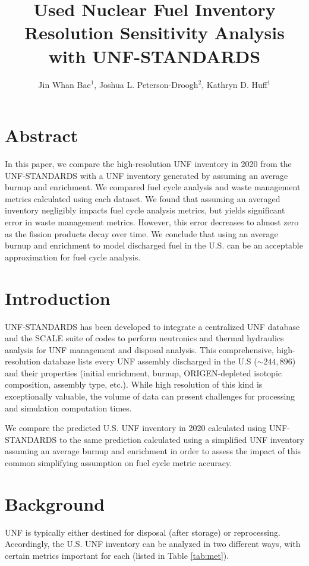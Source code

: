 \documentclass{anstrans}
\title{Used Nuclear Fuel Inventory Resolution Sensitivity Analysis with UNF-STANDARDS}
\author{Jin Whan Bae$^{1}$, Joshua L. Peterson-Droogh$^{2}$, Kathryn D. Huff$^{1}$}
\institute{
$^{1}$ Dept. of Nuclear, Plasma, and Radiological Engineering, University of Illinois at Urbana-Champaign, Urbana, IL
\and
$^{2}$ Oak Ridge National Laboratory, Oak Ridge, TN}
\date{}
\begin{document}
\section{Abstract}
In this paper, we compare the high-resolution \gls{UNF} inventory in 2020 from the \gls{UNF-STANDARDS} \cite{peterson_used_2013}
with a \gls{UNF} inventory generated by assuming an average burnup and enrichment.
We compared fuel cycle analysis and waste management metrics calculated using each dataset. We found that
assuming an averaged inventory negligibly impacts fuel cycle analysis metrics,
but yields significant error in waste management metrics. However, this error decreases to almost zero as the fission products
decay over time. We conclude that using an average burnup and enrichment to model
discharged fuel in the U.S. can be an acceptable approximation for fuel cycle analysis.

\section{Introduction}
\gls{UNF-STANDARDS} has been developed to integrate
a centralized \gls{UNF} database \cite{peterson_used_2013} and the SCALE suite of codes \cite{noauthor_scale_nodate} to
perform neutronics and thermal hydraulics analysis for 
\gls{UNF} management and disposal analysis.
This comprehensive, high-resolution database lists every \gls{UNF} assembly discharged 
in the U.S ($\sim244,896$) and their properties
(initial enrichment, burnup, ORIGEN-depleted isotopic composition, assembly type, etc.).
While high resolution of this kind is exceptionally valuable, the volume of data can 
present challenges for processing and simulation computation times.

We compare the predicted U.S. \gls{UNF} inventory in 2020 calculated using
\gls{UNF-STANDARDS} to the same prediction calculated using a simplified \gls{UNF} 
inventory assuming an average burnup and enrichment in order to assess the impact of this common simplifying assumption on fuel cycle metric accuracy.

\section{Background}
\gls{UNF} is typically either destined for disposal (after storage) or reprocessing.
Accordingly, the U.S. \gls{UNF} inventory can be analyzed in two different
ways, with certain metrics important for each (listed in Table \ref{tab:met}).
\end{document}
